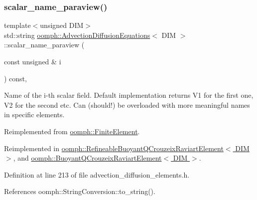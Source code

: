 \subsubsection{\texorpdfstring{scalar\+\_\+name\+\_\+paraview()}{scalar\_name\_paraview()}}
{\footnotesize\ttfamily template$<$unsigned D\+IM$>$ \\
std\+::string \hyperlink{classoomph_1_1AdvectionDiffusionEquations}{oomph\+::\+Advection\+Diffusion\+Equations}$<$ D\+IM $>$\+::scalar\+\_\+name\+\_\+paraview (\begin{DoxyParamCaption}\item[{const unsigned \&}]{i }\end{DoxyParamCaption}) const\hspace{0.3cm}{\ttfamily [inline]}, {\ttfamily [virtual]}}



Name of the i-\/th scalar field. Default implementation returns V1 for the first one, V2 for the second etc. Can (should!) be overloaded with more meaningful names in specific elements. 



Reimplemented from \hyperlink{classoomph_1_1FiniteElement_a49cc2d4f7ed5772bbc96f06760372b51}{oomph\+::\+Finite\+Element}.



Reimplemented in \hyperlink{classoomph_1_1RefineableBuoyantQCrouzeixRaviartElement_ae9b9687a5a15a0089431ad1b143356e5}{oomph\+::\+Refineable\+Buoyant\+Q\+Crouzeix\+Raviart\+Element$<$ D\+I\+M $>$}, and \hyperlink{classoomph_1_1BuoyantQCrouzeixRaviartElement_a26f8112d2ba9c77087e534145a2477c9}{oomph\+::\+Buoyant\+Q\+Crouzeix\+Raviart\+Element$<$ D\+I\+M $>$}.



Definition at line 213 of file advection\+\_\+diffusion\+\_\+elements.\+h.



References oomph\+::\+String\+Conversion\+::to\+\_\+string().

\mbox{\label{classoomph_1_1AdvectionDiffusionEquations_a7e4c60334ef457e6155e84a9d24062cf}} 
